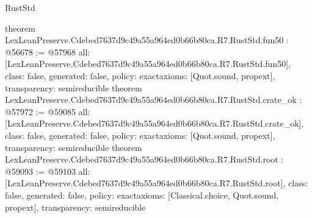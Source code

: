 \begin{lexlean}{RustStd}
\begin{coremodule}
{}
theorem LexLeanPreserve.Cdebed7637d9c49a55a964ed0b66b80ca.R7.RustStd.fun50 : @56678 := @57968 {
  all: [LexLeanPreserve.Cdebed7637d9c49a55a964ed0b66b80ca.R7.RustStd.fun50],
  class: false,
  generated: false,
  policy: exact{axioms: [Quot.sound, propext]},
  transparency: semireducible
}
theorem LexLeanPreserve.Cdebed7637d9c49a55a964ed0b66b80ca.R7.RustStd.crate_ok : @57972 := @59085 {
  all: [LexLeanPreserve.Cdebed7637d9c49a55a964ed0b66b80ca.R7.RustStd.crate_ok],
  class: false,
  generated: false,
  policy: exact{axioms: [Quot.sound, propext]},
  transparency: semireducible
}
theorem LexLeanPreserve.Cdebed7637d9c49a55a964ed0b66b80ca.R7.RustStd.root : @59093 := @59103 {
  all: [LexLeanPreserve.Cdebed7637d9c49a55a964ed0b66b80ca.R7.RustStd.root],
  class: false,
  generated: false,
  policy: exact{axioms: [Classical.choice, Quot.sound, propext]},
  transparency: semireducible
}


\end{coremodule}
\end{lexlean}
